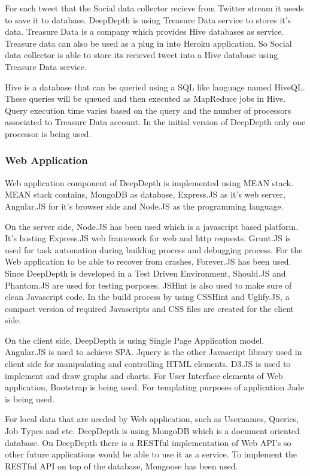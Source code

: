 \documentclass[a4paper,11pt]{report}
\begin{document}
For each tweet that the Social data collector recieve from Twitter stream it needs to save it to database. DeepDepth is using Treasure Data service to stores it's data. Treasure Data is a company which provides Hive databases as service. Treasure data can also be used as a plug in into Heroku application. So Social data collector is able to store its recieved tweet into a Hive database using Treasure Data service.

Hive is a database that can be queried using a SQL like language named HiveQL. These queries will be queued and then executed as MapReduce jobs in Hive. Query execution time varies based on the query and the number of processors associated to Treasure Data account. In the initial version of DeepDepth only one processor is being used.

\subsubsection{Web Application}

Web application component of DeepDepth is implemented using MEAN stack. MEAN stack contains, MongoDB as database, Express.JS as it's web server, Angular.JS for it's browser side and Node.JS as the programming language.

On the server side, Node.JS has been used which is a javascript based platform. It's hosting Express.JS web framework for web and http requests. Grunt.JS is used for task automation during building process and debugging process. For the Web application to be able to recover from crashes, Forever.JS has been used. Since DeepDepth is developed in a Test Driven Environment, Should.JS and Phantom.JS are used for testing porposes. JSHint is also used to make sure of clean Javascript code. In the build process by using CSSHint and Uglify.JS, a compact version of required Javascripts and CSS files are created for the client side.

On the client side, DeepDepth is using Single Page Application model. Angular.JS is used to achieve SPA. Jquery is the other Javascript library used in client side for manipulating and controlling HTML elements. D3.JS is used to implement and draw graphs and charts. For User Interface elements of Web application, Bootstrap is being used. For templating purposes of application Jade is being used.

For local data that are needed by Web application, such as Usernames, Queries, Job Types and etc. DeepDepth is using MongoDB which is a document oriented database. On DeepDepth there is a RESTful implementation of Web API's so other future applications would be able to use it as a service. To implement the RESTful API on top of the database, Mongoose has been used.
\end{document}
